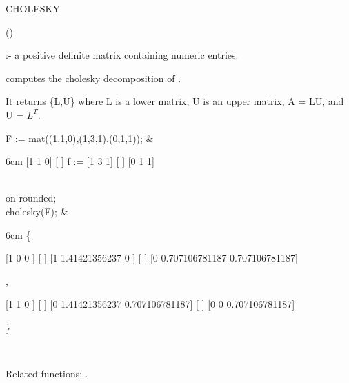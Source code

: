\begin{Operator}[cholesky]{CHOLESKY}

\begin{Syntax}
()
\end{Syntax}

 :- a positive definite matrix containing numeric entries.

 computes the cholesky decomposition of .

It returns \{L,U\} where L is a lower matrix, U is an upper matrix, 
A = LU, and U = $L^T$.

\begin{Examples}
F := mat((1,1,0),(1,3,1),(0,1,1)); &
\begin{multilineoutput}{6cm}
     [1  1  0]
     [       ]
f := [1  3  1]
     [       ]
     [0  1  1]
\end{multilineoutput} \\

on rounded; \\
cholesky(F); & 
\begin{multilineoutput}{6cm}
\{

 [1        0               0       ]
 [                                 ]
 [1  1.41421356237         0       ]
 [                                 ]
 [0  0.707106781187  0.707106781187]

 ,


 [1        1              0       ]
 [                                ]
 [0  1.41421356237  0.707106781187]
 [                                ]
 [0        0        0.707106781187]

\}
\end{multilineoutput} \\

\end{Examples}

Related functions: .

\end{Operator}


